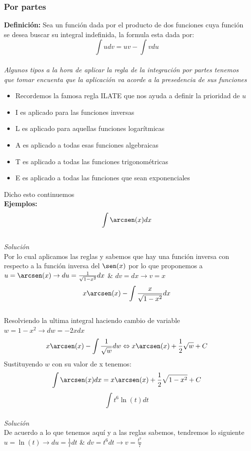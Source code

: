 \documentclass[10pt,executivepaper]{article}
\begin{document}
\subsubsection{Por partes}
\textbf{Definición:} Sea un función dada por el producto de dos funciones cuya función se desea buscar su integral indefinida, la formula esta dada por:\\
\[\int u dv = uv - \int vdu\]\\
\emph{Algunos tipos a la hora de aplicar la regla de la integración por partes tenemos que tomar encuenta que la aplicación va acorde a la presedencia de sus funciones}
\begin{itemize}
  \item Recordemos la famosa regla ILATE que nos ayuda a definir la prioridad de $u$
  \item I es aplicado para las funciones inversas
  \item L es aplicado para aquellas funciones logarítmicas
  \item A es aplicado a todas esas funciones algebraicas
  \item T es aplicado a todas las funciones trigonométricas
  \item E es aplicado a todas las funciones que sean exponenciales
\end{itemize}
Dicho esto continuemos\\
\textbf{Ejemplos:}\\
\[\int \arcsen(x)dx\]\\
\textit{Solución}\\
Por lo cual aplicamos las reglas y sabemos que hay una función inversa con respecto a la función inversa del $\sen(x)$ por lo que proponemos a $u=\arcsen(x)\rightarrow du = \frac{1}{\sqrt{1-x^{2}}}dx$ \& $dv=dx \rightarrow v=x$
\\
\[x\arcsen(x)-\int \frac{x}{\sqrt{1-x^{2}}}dx\]\\
Resolviendo la ultima integral haciendo cambio de variable $w=1-x^{2} \rightarrow dw=-2x dx$\\
\[x\arcsen(x)-\int \frac{1}{\sqrt{w}}dw \Leftrightarrow x\arcsen(x)+\frac{1}{2}\sqrt{w} + C\]
Sustituyendo $w$ con su valor de x tenemos:
\[\int \arcsen(x)dx=x\arcsen(x)+\frac{1}{2}\sqrt{1-x^{2}}+C\]
\vspace{1cm}
\[\int t^{6}\ln(t)dt\]\\
\textit{Solución}\\
De acuerdo a lo que tenemos aquí y a las reglas sabemos, tendremos lo siguiente $u=\ln(t) \rightarrow du=\frac{1}{t}dt$ \& $dv=t^{6}dt \rightarrow v=\frac{t^7}{7}$\\
\end{document}
